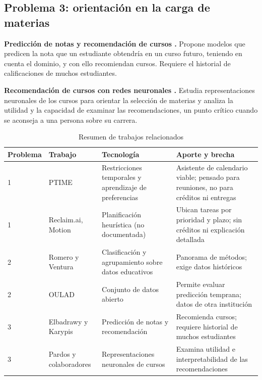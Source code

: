 \subsection{Problema 3: orientación en la carga de materias}

\textbf{Predicción de notas y recomendación de cursos \parencite{Elbadrawy2016}.} Propone modelos que predicen la nota que un estudiante obtendría en un curso futuro, teniendo en cuenta el dominio, y con ello recomiendan cursos. Requiere el historial de calificaciones de muchos estudiantes.

\textbf{Recomendación de cursos con redes neuronales \parencite{Pardos2019}.} Estudia representaciones neuronales de los cursos para orientar la selección de materias y analiza la utilidad y la capacidad de examinar las recomendaciones, un punto crítico cuando se aconseja a una persona sobre su carrera.

\begin{table}[H]
\centering\small
\caption{Resumen de trabajos relacionados}\label{tab:relacionados}
\begin{tabularx}{\textwidth}{l >{\raggedright\arraybackslash}p{3.1cm} >{\raggedright\arraybackslash}X >{\raggedright\arraybackslash}X}
\toprule
Problema & Trabajo & Tecnología & Aporte y brecha \\
\midrule
1 & PTIME & Restricciones temporales y aprendizaje de preferencias & Asistente de calendario viable; pensado para reuniones, no para créditos ni entregas \\
1 & Reclaim.ai, Motion & Planificación heurística (no documentada) & Ubican tareas por prioridad y plazo; sin créditos ni explicación detallada \\
2 & Romero y Ventura & Clasificación y agrupamiento sobre datos educativos & Panorama de métodos; exige datos históricos \\
2 & OULAD & Conjunto de datos abierto & Permite evaluar predicción temprana; datos de otra institución \\
3 & Elbadrawy y Karypis & Predicción de notas y recomendación & Recomienda cursos; requiere historial de muchos estudiantes \\
3 & Pardos y colaboradores & Representaciones neuronales de cursos & Examina utilidad e interpretabilidad de las recomendaciones \\
\bottomrule
\end{tabularx}
\end{table}
